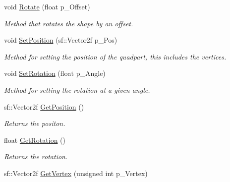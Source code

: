 \begin{DoxyCompactItemize}
void \hyperlink{class_quad_part_ae93071d8999ff84fb5a428c21ba0056b}{Rotate} (float p\+\_\+\+Offset)
\begin{DoxyCompactList}\small\item\em Method that rotates the shape by an offset. \end{DoxyCompactList}\item 
\mbox{\label{class_quad_part_a21cd672702cbe804d4d836100aa3364f}} 
void \hyperlink{class_quad_part_a21cd672702cbe804d4d836100aa3364f}{Set\+Position} (sf\+::\+Vector2f p\+\_\+\+Pos)
\begin{DoxyCompactList}\small\item\em Method for setting the position of the quadpart, this includes the vertices. \end{DoxyCompactList}\item 
\mbox{\label{class_quad_part_a81263369e0fef805b7bf9f2f0358ef16}} 
void \hyperlink{class_quad_part_a81263369e0fef805b7bf9f2f0358ef16}{Set\+Rotation} (float p\+\_\+\+Angle)
\begin{DoxyCompactList}\small\item\em Method for setting the rotation at a given angle. \end{DoxyCompactList}\item 
\mbox{\label{class_quad_part_a5fdd5de2794207b95d573744de8f1837}} 
sf\+::\+Vector2f \hyperlink{class_quad_part_a5fdd5de2794207b95d573744de8f1837}{Get\+Position} ()
\begin{DoxyCompactList}\small\item\em Returns the positon. \end{DoxyCompactList}\item 
\mbox{\label{class_quad_part_ad6b073d0b128af590944337a2a01d2b3}} 
float \hyperlink{class_quad_part_ad6b073d0b128af590944337a2a01d2b3}{Get\+Rotation} ()
\begin{DoxyCompactList}\small\item\em Returns the rotation. \end{DoxyCompactList}\item 
\mbox{\label{class_quad_part_acd1a5f5d8d9a780208be5b75b1900d3c}} 
sf\+::\+Vector2f \hyperlink{class_quad_part_acd1a5f5d8d9a780208be5b75b1900d3c}{Get\+Vertex} (unsigned int p\+\_\+\+Vertex)

\end{DoxyCompactItemize}
